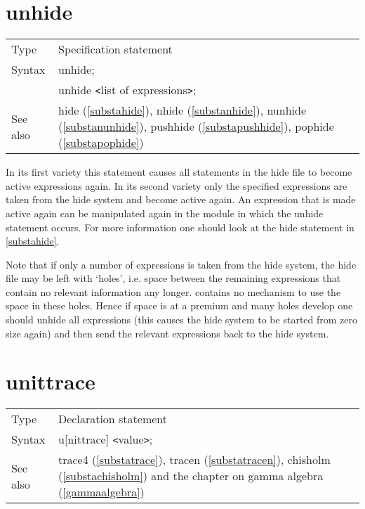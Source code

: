 
\section{unhide}
\label{substaunhide}

\noindent \begin{tabular}{ll}
Type & Specification statement\\
Syntax & unhide; \\
       & unhide {\tt<}list of expressions{\tt>};
\\ See also & hide (\ref{substahide}),
              nhide (\ref{substanhide}),
              nunhide (\ref{substanunhide}),
              pushhide (\ref{substapushhide}),
              pophide (\ref{substapophide})
\end{tabular} \vspace{4mm}

\noindent In its first variety this statement causes all 
statements in the hide file to become 
active expressions again. In its second variety only the 
specified expressions are taken from the hide system and become active 
again. An expression that is made active again can be manipulated again in 
the module in which the unhide statement occurs. For more information one 
should look at the hide statement in \ref{substahide}. \vspace{4mm}

\noindent Note that if only a number of expressions is taken from the hide 
system, the hide file may be left with `holes', i.e. space between the 
remaining expressions that contain no relevant information any longer. 
{\FORM} contains no mechanism to use the space in these holes. Hence if 
space is at a premium and many holes develop one should unhide all 
expressions (this causes the hide system to be started from zero size 
again) and then send the relevant expressions back to the hide system. 
\vspace{10mm}


\section{unittrace}
\label{substaunittrace}

\noindent \begin{tabular}{ll}
Type & Declaration statement\\
Syntax & u[nittrace] {\tt<}value{\tt>}; \\
See also & trace4 (\ref{substatrace}), tracen (\ref{substatracen}),
    chisholm (\ref{substachisholm})
    and the chapter on gamma algebra (\ref{gammaalgebra})
\end{tabular} \vspace{4mm}

